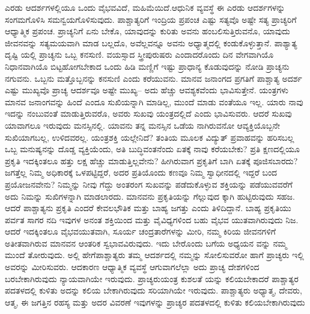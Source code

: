ಎರಡು ಆದರ್ಶಗಳಲ್ಲಿಯೂ ಒಂದು ವೈಭವವಿದೆ, ಮಹಿಮೆಯಿದೆ.ಆಧುನಿಕ ವ್ಯವಸ್ಥೆ ಈ ಎರಡು ಆದರ್ಶಗಳನ್ನು ಸಂಗಮಗೊಳಿಸಿ ಸಮನ್ವಯಗೊಳಿಸುವುದು. ಪಾಶ್ಚಾತ್ಯರಿಗೆ ಇಂದ್ರಿಯ ಪ್ರಪಂಚ ಎಷ್ಟು ಸತ್ಯವೊ ಅಷ್ಟೇ ಸತ್ಯ ಪ್ರಾಚ್ಯರಿಗೆ ಆಧ್ಯಾತ್ಮಿಕ ಪ್ರಪಂಚ. ಪ್ರಾಚ್ಯನಿಗೆ ಏನು ಬೇಕೊ, ಯಾವುದನ್ನು ಕುರಿತು ಅವನು ಹಂಬಲಿಸುತ್ತಿರುವನೊ, ಯಾವುದು ಜೀವನವನ್ನು ಸತ್ಯಮಯವಾಗಿ ಮಾಡ ಬಲ್ಲದೊ, ಅವೆಲ್ಲವನ್ನೂ ಅವನು ಅಧ್ಯಾತ್ಮದಲ್ಲಿ ಕಂಡುಕೊಳ್ಳುತ್ತಾನೆ. ಪಾಶ್ಯಾತ್ಯ ದೃಷ್ಟಿ ಯಲ್ಲಿ ಪ್ರಾಚ್ಯನು ಒಬ್ಬ ಕನಸುಣಿ. ವಯಸ್ಸಾದ ಸ್ತ್ರೀಪುರುಷರು ಎಂದಾದರೊಂದು ದಿನ ವೇಗವಾಗಿಯೊ ನಿಧಾನವಾಗಿಯೊ ಬಿಟ್ಟಹೋಗಬೇಕಾದ ಒಂದು ಹಿಡಿ ಮಣ್ಣಿಗೆ ಇಷ್ಟು ಪ್ರಾಧಾನ್ಯ ಕೊಡುವುದನ್ನು ನೋಡಿ ಪ್ರಾಚ್ಯನು ನಗುವನು. ಒಬ್ಬನು ಮತ್ತೊಬ್ಬನನ್ನು ಕನಸುಣಿ ಎಂದು ಕರೆಯುವನು. ಮಾನವ ಜನಾಂಗದ ಪ್ರಗತಿಗೆ ಪಾಶ್ಚಾತ್ಯ ಅದರ್ಶ ಎಷ್ಟು ಮುಖ್ಯವೊ ಪ್ರಾಚ್ಯ ಆದರ್ಶವೂ ಅಷ್ಟೇ ಮುಖ್ಯ– ಅದು ಹೆಚ್ಚು ಆವಶ್ಯಕವೆಂದು ಭಾವಿಸುತ್ತೇನೆ. ಯಂತ್ರಗಳು ಮಾನವ ಜನಾಂಗವನ್ನು ಹಿಂದೆ ಎಂದೂ ಸುಖಿಯನ್ನಾಗಿ ಮಾಡಿಲ್ಲ, ಮುಂದೆ ಮಾಡು ವಂತೆಯೂ ಇಲ್ಲ. ಯಾರು ನಾವು ಇದನ್ನು ನಂಬುವಂತೆ ಮಾಡುತ್ತಿರುವರೊ, ಅವರು ಸುಖವು ಯಂತ್ರದಲ್ಲಿದೆ ಎಂದು ಭಾವಿಸುವರು. ಆದರೆ ಸುಖವು ಯಾವಾಗಲೂ ಇರುವುದು ಮನಸ್ಸಿನಲ್ಲಿ. ಯಾವನು ತನ್ನ ಮನಸ್ಸಿನ ಒಡೆಯ ನಾಗಿರುವನೋ ಆವ್ಯಕ್ತಿಯೊಬ್ಬನೇ ಸುಖಿಯಾಗಬಲ್ಲ, ಉಳಿದವರಲ್ಲ. ಯಂತ್ರಶಕ್ತಿ ಯಲ್ಲೇನಿದೆ? ತಂತಿಯ ಮೂಲಕ ವಿದ್ಯುತ್​ ಪ್ರವಾಹವನ್ನು ಹರಿಸಬಲ್ಲ ಒಬ್ಬ ಮನುಷ್ಯನನ್ನು ದೊಡ್ಡ ವ್ಯಕ್ತಿಯೆಂದು, ಅತಿ ಬುದ್ಧಿವಂತನೆಂದು ಏತಕ್ಕೆ ನಾವು ಕರೆಯಬೇಕು? ಪ್ರತಿ ಕ್ಷಣದಲ್ಲಿಯೂ ಪ್ರಕೃತಿ ಇದಕ್ಕಿಂತಲೂ ಹತ್ತು ಲಕ್ಷ ಹೆಚ್ಚು ಮಾಡುತ್ತಿಲ್ಲವೇನು? ಹೀಗಿರುವಾಗ ಪ್ರಕೃತಿಗೆ ಬಾಗಿ ಏತಕ್ಕೆ ಪೂಜಿಸಬಾರದು? ಜಗತ್ತೆಲ್ಲ ನಿಮ್ಮ ಅಧಿಕಾರಕ್ಕೆ ಒಳಪಟ್ಟಿದ್ದರೆ, ಅದರ ಪ್ರತಿಯೊಂದು ಕಣವೂ ನಿಮ್ಮ ಸ್ವಾಧೀನದಲ್ಲಿ ಇದ್ದರೆ ಬಂದ ಪ್ರಯೋಜನವೇನು? ನಿಮ್ಮನ್ನು ನೀವು ಗೆದ್ದು ಅಂತರಂಗ ಸುಖವನ್ನು ಪಡೆದುಕೊಳ್ಳುವ ಶಕ್ತಿಯನ್ನು ಪಡೆಯುವವರೆಗೆ ಅದು ನಿಮನ್ನು ಸುಖಿಗಳನ್ನಾಗಿ ಮಾಡಲಾರದು. ಮಾನವನು ಪ್ರಕೃತಿಯನ್ನು ಗೆಲ್ಲುವುದ ಕ್ಕಾಗಿ ಹುಟ್ಟಿರುವುದು ಸಹಜ. ಆದರೆ ಪಾಶ್ಚಾತ್ಯನು ಪ್ರಕೃತಿ ಎಂದರೆ ಕೇವಲಭೌತಿಕ ಮತ್ತು ಬಾಹ್ಯ ಜಗತ್ತು ಎಂದು ತಿಳಿದಿದ್ದಾನೆ. ಬಾಹ್ಯ ಪ್ರಕೃತಿಯು ಪರ್ವತ ಸಾಗರ ನದಿ ಇವುಗಳ ಅನಂತ ಶಕ್ತಿಯಿಂದ ಮತ್ತು ವೈವಿಧ್ಯಗಳಿಂದ ಬಹು ವೈಭವ ಯುತವಾಗಿರುವುದು ನಿಜ. ಆದರೆ ಇದಕ್ಕಿಂತಲೂ ವೈಭವಯುತವಾಗಿ, ಸೂರ್ಯ ಚಂದ್ರತಾರೆಗಳನ್ನು ಮೀರಿ, ನಮ್ಮ ಕಿರಿಯ ಜೀವನಗಳಿಗೆ ಅತೀತವಾಗಿರುವ ಮಾನವನ ಆಂತರಿಕ ಸ್ವಭಾವವಿರುವುದು. ಇದು ಬೇರೊಂದು ಬಗೆಯ ಅಧ್ಯಯನ ವನ್ನು ನಮ್ಮ ಮುಂದೆ ತೋರುವುದು. ಅಲ್ಲಿ ಹೇಗೆಪಾಶ್ಚಾತ್ಯರು ತಮ್ಮ ಆದರ್ಶದಲ್ಲಿ ನಮ್ಮನ್ನು ಸೋಲಿಸುವರೋ ಹಾಗೆ ಪ್ರಾಚ್ಯರು ಇಲ್ಲಿ ಅವರನ್ನು ಮೀರಿಸುವರು. ಆದಕಾರಣ ಆಧ್ಯಾತ್ಮಿಕ ವ್ಯವಸ್ಥೆ ಆಗುವಾಗಲೆಲ್ಲಾ ಅದು ಪ್ರಾಚ್ಯ ದೇಶಗಳಿಂದ ಬರಬೇಕಾಗಿರುವುದು ನ್ಯಾಯವಾಗಿಯೇ ಇರುವುದು. ಪ್ರಾಚ್ಯರುಯಂತ್ರ ಕುಶಲತೆ ಯನ್ನು ಕಲಿಯಬೇಕಾದರೆ ಪಾಶ್ಚಾತ್ಯರ ಪದತಳದಲ್ಲಿ ಕುಳಿತು ಅದನ್ನು ಕಲಿಯ ಬೇಕಾಗಿರುವುದು ಸರಿಯಾಗಿಯೇ ಇರುವುದು. ಪಾಶ್ಚಾತ್ಯರು ಅಧ್ಯಾತ್ಮ, ದೇವರು, ಆತ್ಮ, ಈ ಜಗತ್ತಿನ ರಹಸ್ಯ ಮತ್ತು ಅದರ ವಿವರಣೆ ಇವುಗಳನ್ನು ಪ್ರಾಚ್ಯರ ಪದತಳದಲ್ಲಿ ಕುಳಿತು ಕಲಿಯಬೇಕಾಗಿರುವುದು

